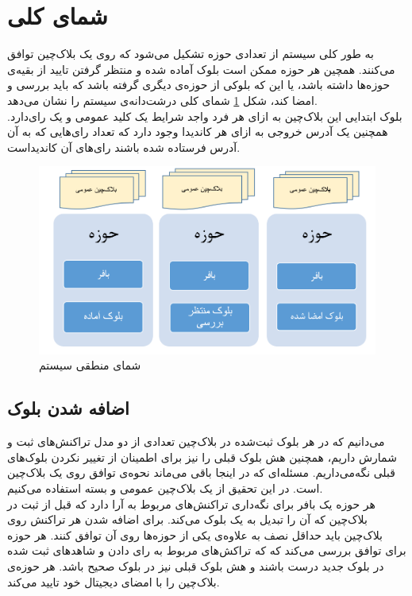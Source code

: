 \section{شمای کلی}
به طور کلی سیستم از تعدادی حوزه‌ تشکیل می‌شود که روی یک بلاک‌چین توافق می‌کنند. همچین هر حوزه ممکن است بلوک‌ آماده شده و منتظر گرفتن تایید از بقیه‌ی حوزه‌ها داشته باشد، یا این که بلوکی از حوزه‌ی دیگری گرفته باشد که باید بررسی و امضا کند، شکل \ref{fig:bigpic} شمای کلی درشت‌دانه‌ی سیستم را نشان می‌دهد.
\\
بلوک ابتدایی این بلاک‌چین به ازای هر فرد واجد شرایط یک کلید عمومی و یک رای‌دارد. همچنین یک آدرس خروجی به ازای هر کاندیدا وجود دارد که تعداد رای‌هایی که به آن آدرس فرستاده شده باشند رای‌های آن‌ کاندیداست. 
 
\begin{figure}[th]
	\centering
	\includegraphics[width=1\linewidth]{blockchain.PNG}
	\caption {شمای منطقی سیستم}
	\label{fig:bigpic}
\end{figure}

\subsection{اضافه شدن بلوک}
می‌دانیم که در هر بلوک ثبت‌شده در بلاک‌چین تعدادی از دو مدل تراکنش‌های ثبت و شمارش داریم، همچنین هش بلوک قبلی را نیز برای اطمینان از تغییر نکردن بلوک‌های قبلی نگه‌می‌داریم. مسئله‌ای که در اینجا باقی می‌ماند نحوه‌ی توافق روی یک بلاک‌چین است. در این تحقیق از یک بلاک‌چین عمومی و بسته استفاده می‌کنیم.
\\
هر حوزه یک بافر برای نگه‌داری تراکنش‌های مربوط به آرا دارد که قبل از ثبت در بلاک‌چین که آن را تبدیل به یک بلوک می‌کند. برای اضافه شدن هر تراکنش روی بلاک‌چین باید حداقل نصف به علاوه‌ی یکی از حوزه‌ها روی آن توافق کنند. هر حوزه برای توافق بررسی می‌کند که که تراکش‌های مربوط به رای دادن و شاهد‌های ثبت شده در بلوک جدید درست باشند و هش بلوک قبلی نیز در بلوک صحیح باشد. هر حوزه‌ی بلاک‌چین را با امضای دیجیتال خود تایید می‌کند. 

